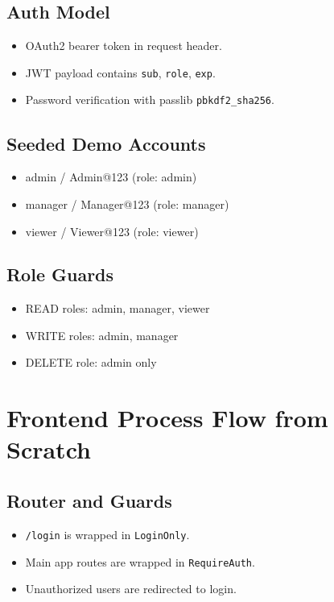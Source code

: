 \documentclass[11pt,a4paper]{article}
\begin{document}
\subsection{Auth Model}
\begin{itemize}
  \item OAuth2 bearer token in request header.
  \item JWT payload contains \texttt{sub}, \texttt{role}, \texttt{exp}.
  \item Password verification with passlib \texttt{pbkdf2\_sha256}.
\end{itemize}

\subsection{Seeded Demo Accounts}
\begin{itemize}
  \item admin / Admin@123 (role: admin)
  \item manager / Manager@123 (role: manager)
  \item viewer / Viewer@123 (role: viewer)
\end{itemize}

\subsection{Role Guards}
\begin{itemize}
  \item READ roles: admin, manager, viewer
  \item WRITE roles: admin, manager
  \item DELETE role: admin only
\end{itemize}

\section{Frontend Process Flow from Scratch}
\subsection{Router and Guards}
\begin{itemize}
  \item \texttt{/login} is wrapped in \texttt{LoginOnly}.
  \item Main app routes are wrapped in \texttt{RequireAuth}.
  \item Unauthorized users are redirected to login.
\end{itemize}
\end{document}
